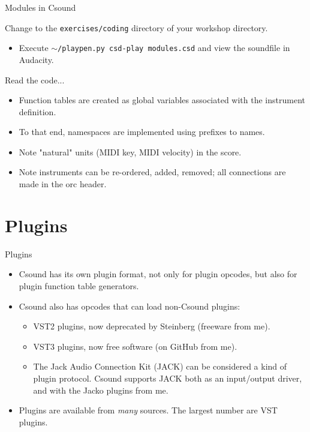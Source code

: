 \documentclass{beamer}
\begin{document}
\begin{frame}{Modules in Csound}
\begin{example}
Change to the \texttt{exercises/coding} directory of your workshop directory.
\begin{itemize}
\item Execute \texttt{$\sim$/playpen.py csd-play modules.csd} and view the soundfile in Audacity.
\end{itemize}
Read the code...
\begin{itemize}
\item Function tables are created as global variables associated with the instrument definition.
\item To that end, namespaces are implemented using prefixes to names.
\item Note "natural" units (MIDI key, MIDI velocity) in the score.
\item Note instruments can be re-ordered, added, removed; all connections are made in the orc header.
\end{itemize}
\end{example}
\end{frame}

\section{Plugins}

\begin{frame}{Plugins}
\begin{itemize}
\item Csound has its own plugin format, not only for plugin opcodes, but also for plugin function table generators.
\item Csound also has opcodes that can load non-Csound plugins:
\begin{itemize}
\item VST2 plugins, now deprecated by Steinberg (freeware from me).
\item VST3 plugins, now free software (on GitHub from me).
\item The Jack Audio Connection Kit (JACK) can be considered a kind of plugin protocol. Csound supports JACK both as an input/output driver, and with the Jacko plugins from me.
\end{itemize}
\item Plugins are available from \emph{many} sources. The largest number are VST plugins.
\end{itemize}
\end{frame}
\end{document}
